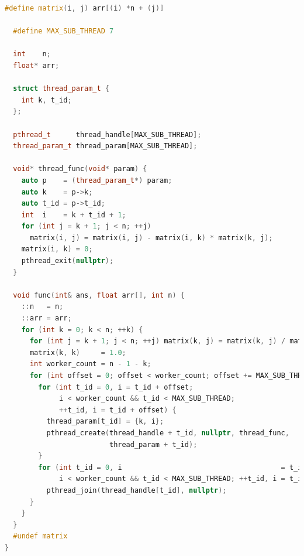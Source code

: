 \documentclass[a4paper]{article}
\begin{document}
\begin{lstlisting}[title=动态创建线程frame=trbl,language={C++}]
  #define matrix(i, j) arr[(i) *n + (j)]

  #define MAX_SUB_THREAD 7
  
  int    n;
  float* arr;
  
  struct thread_param_t {
    int k, t_id;
  };
  
  pthread_t      thread_handle[MAX_SUB_THREAD];
  thread_param_t thread_param[MAX_SUB_THREAD];
  
  void* thread_func(void* param) {
    auto p    = (thread_param_t*) param;
    auto k    = p->k;
    auto t_id = p->t_id;
    int  i    = k + t_id + 1;
    for (int j = k + 1; j < n; ++j)
      matrix(i, j) = matrix(i, j) - matrix(i, k) * matrix(k, j);
    matrix(i, k) = 0;
    pthread_exit(nullptr);
  }
  
  void func(int& ans, float arr[], int n) {
    ::n   = n;
    ::arr = arr;
    for (int k = 0; k < n; ++k) {
      for (int j = k + 1; j < n; ++j) matrix(k, j) = matrix(k, j) / matrix(k, k);
      matrix(k, k)     = 1.0;
      int worker_count = n - 1 - k;
      for (int offset = 0; offset < worker_count; offset += MAX_SUB_THREAD) {
        for (int t_id = 0, i = t_id + offset;
             i < worker_count && t_id < MAX_SUB_THREAD;
             ++t_id, i = t_id + offset) {
          thread_param[t_id] = {k, i};
          pthread_create(thread_handle + t_id, nullptr, thread_func,
                         thread_param + t_id);
        }
        for (int t_id = 0, i                                      = t_id + offset;
             i < worker_count && t_id < MAX_SUB_THREAD; ++t_id, i = t_id + offset)
          pthread_join(thread_handle[t_id], nullptr);
      }
    }
  }
  #undef matrix
}
\end{lstlisting}
\end{document}
